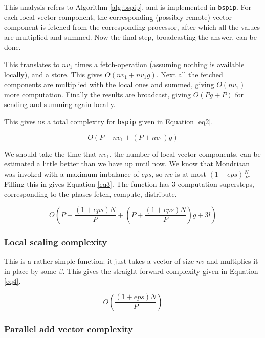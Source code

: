\documentclass[a4paper]{article}
\begin{document}
This analysis refers to Algorithm \ref{alg:bspip}, and is
implemented in \texttt{bspip}. For each local vector component,
the corresponding (possibly remote) vector component is fetched
from the corresponding processor, after which all the values
are multiplied and summed. Now the final step, broadcasting the answer,
can be done.

This translates to $nv_1$ times a fetch-operation (assuming nothing is
available locally), and a store. This gives $O(nv_1 + nv_1 g)$. Next
all the fetched components are multiplied with the local ones and summed,
giving $O(nv_1)$ more computation. Finally the results are broadcast,
giving $O(P g + P)$ for sending and summing again locally.

This gives us a total complexity for \texttt{bspip} given in Equation \ref{eq2}.

\begin{equation}
    O(P + nv_1 + (P + nv_1) g)
    \label{eq2}
\end{equation}

We should take the time that $nv_1$, the number of local vector
components, can be estimated a little better than we have up until now.
We know that Mondriaan was invoked with a maximum imbalance of $eps$,
so $nv$ is at most $(1+eps)\frac{N}{P}$. Filling this in gives Equation \ref{eq3}. The function has 3 computation supersteps, corresponding to the phases fetch, compute, distribute.

\begin{equation}
    O\left(P + \frac{\left(1+eps\right)N}{P} + \left(P + \frac{(1+eps)N}{P}\right) g + 3l\right)
    \label{eq3}
\end{equation}

\subsubsection{Local scaling complexity}

This is a rather simple function: it just takes a vector of size
$nv$ and multiplies it in-place by some $\beta$. This gives the
straight forward complexity given in Equation \ref{eq4}.

\begin{equation}
    O\left( \frac{\left(1+eps\right)N}{P}\right)
    \label{eq4}
\end{equation}

\subsubsection{Parallel add vector complexity}
\end{document}
